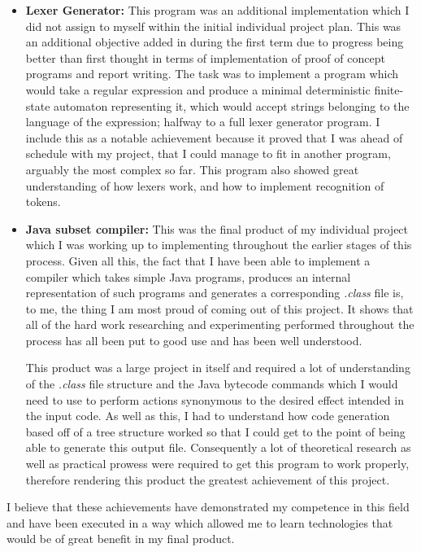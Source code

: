 \documentclass[a4paper, 11pt]{article}
\begin{document}
\begin{itemize}
\item{\textbf{Lexer Generator:} This program was an additional implementation which I did not assign to myself within the initial individual project plan. This was an additional objective added in during the first term due to progress being better than first thought in terms of implementation of proof of concept programs and report writing. The task was to implement a program which would take a regular expression and produce a minimal deterministic finite-state automaton representing it, which would accept strings belonging to the language of the expression; halfway to a full lexer generator program. I include this as a notable achievement because it proved that I was ahead of schedule with my project, that I could manage to fit in another program, arguably the most complex so far. This program also showed great understanding of how lexers work, and how to implement recognition of tokens.}

\item{\textbf{Java subset compiler:} This was the final product of my individual project which I was working up to implementing throughout the earlier stages of this process. Given all this, the fact that I have been able to implement a compiler which takes simple Java programs, produces an internal representation of such programs and generates a corresponding \textit{.class} file is, to me, the thing I am most proud of coming out of this project. It shows that all of the hard work researching and experimenting performed throughout the process has all been put to good use and has been well understood.

This product was a large project in itself and required a lot of understanding of the \textit{.class} file structure and the Java bytecode commands which I would need to use to perform actions synonymous to the desired effect intended in the input code. As well as this, I had to understand how code generation based off of a tree structure worked so that I could get to the point of being able to generate this output file. Consequently a lot of theoretical research as well as practical prowess were required to get this program to work properly, therefore rendering this product the greatest achievement of this project.} 
\end{itemize}
I believe that these achievements have demonstrated my competence in this field and have been executed in a way which allowed me to learn technologies that would be of great benefit in my final product.
\end{document}
